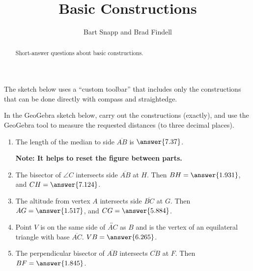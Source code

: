 \documentclass[nooutcomes]{ximera}
\title{Basic Constructions}
\author{Bart Snapp and Brad Findell}
\begin{document}
\begin{abstract}
Short-answer questions about basic constructions. 
\end{abstract}
\maketitle


\begin{warning}
The sketch below uses a ``custom toolbar'' that includes only the constructions that can be done directly with compass and straightedge.  
\end{warning}
\begin{problem}
In the GeoGebra sketch below, carry out the constructions (exactly), and use the GeoGebra tool to measure the requested distances (to three decimal places).  
\begin{center}  
\end{center}
%
\begin{enumerate}
\item The length of the median to side $\overline{AB}$ 
is $\answer{7.37}$.  

\textbf{Note: It helps to reset the figure between parts.}  

\item The bisector of $\angle C$ intersects side $\overline{AB}$ at $H$.  
Then $BH =  \answer{1.931}$, and $CH = \answer{7.124}$.  

\item The altitude from vertex $A$ intersects side $\overline{BC}$ at $G$.
Then $AG = \answer{1.517}$, and 
$CG = \answer{5.884}$.  

\item Point $V$ is on the same side of $\overleftrightarrow{AC}$ as $B$ and is the vertex of an equilateral triangle with base $\overline{AC}$.  
$VB = \answer{6.265}$. 

\item The perpendicular bisector of $\overline{AB}$ intersects $\overline{CB}$ at $F$.  
Then $BF = \answer{1.845}$.
\end{enumerate}

\end{problem}
\end{document}
